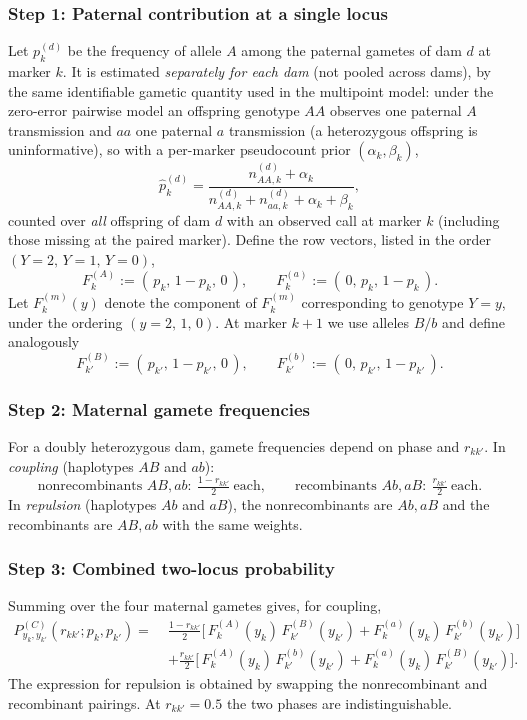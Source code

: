 \documentclass[11pt]{article}
\begin{document}
\subsubsection{Step 1: Paternal contribution at a single locus}
Let $p_k^{(d)}$ be the frequency of allele $A$ among the paternal gametes of dam $d$ at marker $k$.
It is estimated \emph{separately for each dam} (not pooled across dams), by the same identifiable
gametic quantity used in the multipoint model: under the zero-error pairwise model an offspring
genotype $AA$ observes one paternal $A$ transmission and $aa$ one paternal $a$ transmission (a
heterozygous offspring is uninformative), so with a per-marker pseudocount prior
$(\alpha_k,\beta_k)$,
\[
\hat p_k^{(d)} = \frac{n^{(d)}_{AA,k}+\alpha_k}{n^{(d)}_{AA,k}+n^{(d)}_{aa,k}+\alpha_k+\beta_k},
\]
counted over \emph{all} offspring of dam $d$ with an observed call at marker $k$ (including those
missing at the paired marker). Define the row vectors, listed in the order $(Y=2,\,Y=1,\,Y=0)$,
\[
F_k^{(A)} := (\,p_k,\,1-p_k,\,0\,), \qquad
F_k^{(a)} := (\,0,\,p_k,\,1-p_k\,).
\]
Let $F_k^{(m)}(y)$ denote the component of $F_k^{(m)}$ corresponding to genotype $Y=y$,
under the ordering $(y=2,\,1,\,0)$.
At marker $k{+}1$ we use alleles $B/b$ and define analogously
\[
F_{k'}^{(B)} := (\,p_{k'},\,1-p_{k'},\,0\,), \qquad
F_{k'}^{(b)} := (\,0,\,p_{k'},\,1-p_{k'}\,).
\]

\subsubsection{Step 2: Maternal gamete frequencies}
For a doubly heterozygous dam, gamete frequencies depend on phase and $r_{kk'}$.
In \emph{coupling} (haplotypes $AB$ and $ab$):
\[
\text{nonrecombinants } AB,ab:\ \tfrac{1-r_{kk'}}{2}\ \text{each}, \qquad
\text{recombinants } Ab,aB:\ \tfrac{r_{kk'}}{2}\ \text{each}.
\]
In \emph{repulsion} (haplotypes $Ab$ and $aB$), the nonrecombinants are $Ab,aB$ and the recombinants are $AB,ab$ with the same weights.

\subsubsection{Step 3: Combined two-locus probability}
Summing over the four maternal gametes gives, for coupling,
\[
\begin{aligned}
P^{(C)}_{y_k,y_{k'}}(r_{kk'};p_k,p_{k'})
=\;&\frac{1-r_{kk'}}{2}\Big[\,F_k^{(A)}(y_k)\,F_{k'}^{(B)}(y_{k'})
      + F_k^{(a)}(y_k)\,F_{k'}^{(b)}(y_{k'})\Big] \\
&+\frac{r_{kk'}}{2}\Big[\,F_k^{(A)}(y_k)\,F_{k'}^{(b)}(y_{k'})
      + F_k^{(a)}(y_k)\,F_{k'}^{(B)}(y_{k'})\Big].
\end{aligned}
\]
The expression for repulsion is obtained by swapping the nonrecombinant and recombinant pairings. At $r_{kk'}=0.5$ the two phases are indistinguishable.
\end{document}
